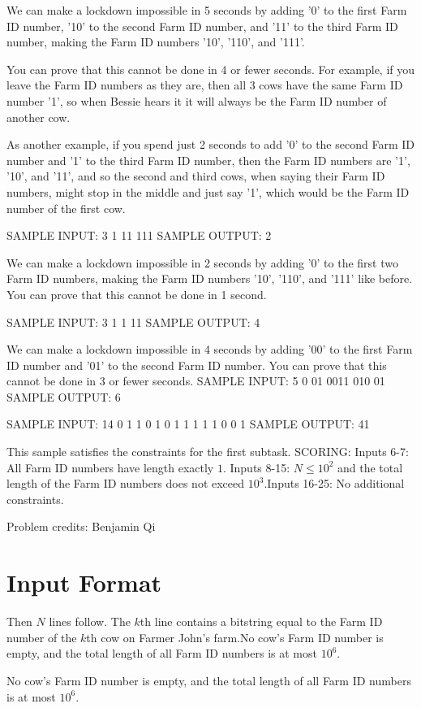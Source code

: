 \documentclass[12pt]{article}
\begin{document}
We can make a lockdown impossible in 5 seconds by adding '0' to the first Farm
ID number, '10' to the second Farm ID number, and '11' to the third Farm ID
number, making the Farm ID numbers '10', '110', and '111'.

You can prove that this cannot be done in 4 or fewer seconds. For example, if
you leave the Farm ID numbers as they are, then all 3 cows have the same Farm ID
number '1', so when Bessie hears it it will always be the Farm ID number of
another cow.

As another example, if you spend just 2 seconds to add '0' to the second Farm ID
number and '1' to the third Farm ID number, then the Farm ID numbers are '1',
'10', and '11', and so the second and third cows, when saying their Farm ID
numbers, might stop in the middle and just say '1', which would be the Farm ID
number of the first cow.

SAMPLE INPUT:
3
1
11
111
SAMPLE OUTPUT: 
2

We can make a lockdown impossible in 2 seconds by adding '0' to the first two
Farm ID numbers, making the Farm ID numbers '10', '110', and '111' like before.
You can prove that this cannot be done in 1 second.

SAMPLE INPUT:
3
1
1
11
SAMPLE OUTPUT: 
4

We can make a lockdown impossible in 4 seconds by adding '00' to the first Farm
ID number and '01' to the second Farm ID number. You can prove that this cannot
be done in 3 or fewer seconds. 
SAMPLE INPUT:
5
0
01
0011
010
01
SAMPLE OUTPUT: 
6

SAMPLE INPUT:
14
0
1
1
0
1
0
1
1
1
1
1
0
0
1
SAMPLE OUTPUT: 
41

This sample satisfies the constraints for the first subtask.
SCORING:
 Inputs 6-7: All Farm ID numbers have length exactly $1$. Inputs 8-15: $N\le 10^2$ and the total length of the Farm ID numbers does
not exceed $10^3$.Inputs 16-25: No additional constraints.


Problem credits: Benjamin Qi



\section*{Input Format}
Then $N$ lines follow. The $k$th line contains a bitstring equal to the Farm ID
number of the $k$th cow on Farmer John's farm.No cow's Farm ID number is empty, and the total length of all Farm ID numbers is
at most $10^6$.

No cow's Farm ID number is empty, and the total length of all Farm ID numbers is
at most $10^6$.
\end{document}
